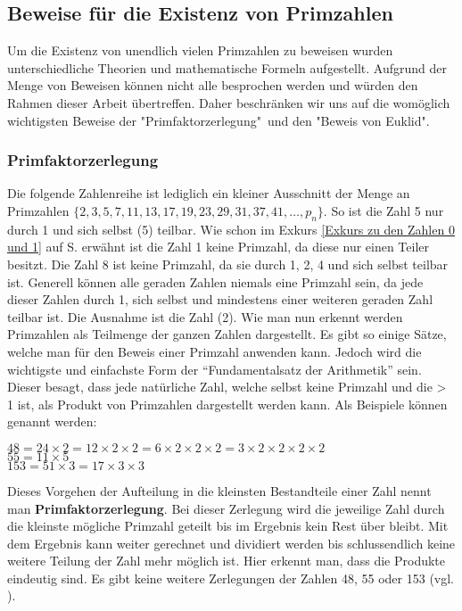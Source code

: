 \documentclass[12pt,a4paper]{article}
\theoremstyle{definition}
\begin{document}
\subsection{Beweise für die Existenz von Primzahlen}\label{Beweise für die Existenz von Primzahlen}
Um die Existenz von unendlich vielen Primzahlen zu beweisen wurden unterschiedliche Theorien und mathematische Formeln aufgestellt.
Aufgrund der Menge von Beweisen können nicht alle besprochen werden und würden den Rahmen dieser Arbeit übertreffen.
Daher beschränken wir uns auf die womöglich wichtigsten Beweise der "Primfaktorzerlegung"\ und den "Beweis von Euklid".

\subsubsection{Primfaktorzerlegung}\label{Primfaktorzerlegung}
Die folgende Zahlenreihe ist lediglich ein kleiner Ausschnitt der Menge an Primzahlen $\{2, 3, 5, 7, 11, 13, 17, 19, 23, 29, 31, 37, 41, …, p_n\}$.
So ist die Zahl 5 nur durch 1 und sich selbst (5) teilbar.
Wie schon im Exkurs \ref{Exkurs zu den Zahlen 0 und 1} auf S. \pageref{Exkurs zu den Zahlen 0 und 1} erwähnt ist die Zahl 1 keine Primzahl, da diese nur einen Teiler besitzt.
Die Zahl 8 ist keine Primzahl, da sie durch 1, 2, 4 und sich selbst teilbar ist.
Generell können alle geraden Zahlen niemals eine Primzahl sein, da jede dieser Zahlen durch 1, sich selbst und mindestens einer weiteren geraden Zahl teilbar ist.
Die Ausnahme ist die Zahl (2).
Wie man nun erkennt werden Primzahlen als Teilmenge der ganzen Zahlen dargestellt. %
Es gibt so einige Sätze, welche man für den Beweis einer Primzahl anwenden kann.
Jedoch wird die wichtigste und einfachste Form der “Fundamentalsatz der Arithmetik” sein.
Dieser besagt, dass jede natürliche Zahl, welche selbst keine Primzahl und die > 1 ist, als Produkt von Primzahlen dargestellt werden kann.
Als Beispiele können genannt werden:\
\begin{center}$48 = 24\times{2} = 12\times{2}\times{2} = 6\times{2}\times{2}\times{2} = 3\times{2}\times{2}\times{2}\times{2}$\\
$55 = 11\times5$\\
$153 = 51\times{3} = 17\times{3}\times{3}$\end{center}
Dieses Vorgehen der Aufteilung in die kleinsten Bestandteile einer Zahl nennt man \textbf{Primfaktorzerlegung}.
Bei dieser Zerlegung wird die jeweilige Zahl durch die kleinste mögliche Primzahl geteilt bis im Ergebnis kein Rest über bleibt.
Mit dem Ergebnis kann weiter gerechnet und dividiert werden bis schlussendlich keine weitere Teilung der Zahl mehr möglich ist.
Hier erkennt man, dass die Produkte eindeutig sind.
Es gibt keine weitere Zerlegungen der Zahlen 48, 55 oder 153 (vgl. \cite{Hemmerich2020}).
\end{document}
